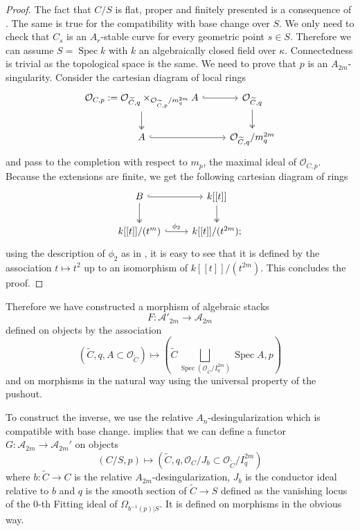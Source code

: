 \documentclass{alggeom}
\numberwithin{equation}{section}
\numberwithin{subsection}{section}
\theoremstyle{definition}
\theoremstyle{remark}
\newcommand\cA{\mathcal{A}} \newcommand\cB{\mathcal{B}}
\newcommand\cO{\mathcal{O}} \newcommand\cP{\mathcal{P}}
\newcommand\spec{\operatorname{Spec}}
\begin{document}
\begin{proof}
	The fact that $C/S$ is flat, proper and finitely presented is a consequence of . The same is true for the compatibility with base change over $S$. We only need to check that $C_s$ is an $A_r$-stable curve for every geometric point $s \in S$. Therefore we can assume $S=\spec k$ with $k$ an algebraically closed field over $\kappa$. Connectedness is trivial as the topological space is the same. We need to prove that $p$ is an $A_{2m}$-singularity. Consider the cartesian diagram of local rings
	$$
	\begin{tikzcd}
		{\cO_{C,p}:=\cO_{\widetilde{C},q}\times_{\cO_{\widetilde{C},p}/m_q^{2m}} A} \arrow[d, two heads] \arrow[r, hook] & {\cO_{\widetilde{C},q}} \arrow[d, two heads] \\
		A \arrow[r, hook]                                                                                     & {\cO_{\widetilde{C},q}/m_q^{2m}}            
	\end{tikzcd}
	$$
	and pass to the completion with respect to $m_p$, the maximal ideal of $\cO_{C,p}$. Because the extensions are finite, we get the following cartesian diagram of rings
	$$
	\begin{tikzcd}
		B \arrow[d, two heads] \arrow[r, hook]   & {k[[t]]} \arrow[d, two heads] \\
		{k[[t]]/(t^m)} \arrow[r, "\phi_2", hook] & {k[[t]]/(t^{2m})};            
	\end{tikzcd}
	$$
	using the description of $\phi_2$ as in , it is easy to see that it is defined by the association $t \mapsto t^2$ up to an isomorphism of $k[[t]]/(t^{2m})$. This concludes the proof.
\end{proof}

Therefore we have constructed a morphism of algebraic stacks
$$F:\cA'_{2m} \longrightarrow \cA_{2m}$$ 
defined on objects by the association
$$(\widetilde{C},q,A\subset \cO_{\widetilde{C}}) \mapsto (\widetilde{C}\bigsqcup_{\spec (\cO_{\widetilde{C}}/I_q^{2m})} \spec A, p) $$
and on morphisms in the natural way using the universal property of the pushout. 

To construct the inverse, we use the relative $A_n$-desingularization which is compatible with base change.  implies that we can define a functor $G:\cA_{2m}\rightarrow \cA_{2m}'$ on objects 
$$ (C/S,p) \mapsto (\widetilde{C},q, \cO_C/J_b \subset \cO_{\widetilde{C}}/I_q^{2m}) $$
where $b:\widetilde{C}\rightarrow C$ is the relative $A_{2m}$-desingularization, $J_b$ is the conductor ideal relative to $b$ and $q$ is the smooth section of $\widetilde{C}\rightarrow S$ defined as the vanishing locus of the $0$-th Fitting ideal of $\Omega_{b^{-1}(p)|S}$. It is defined on morphisms in the obvious way. 
\end{document}
